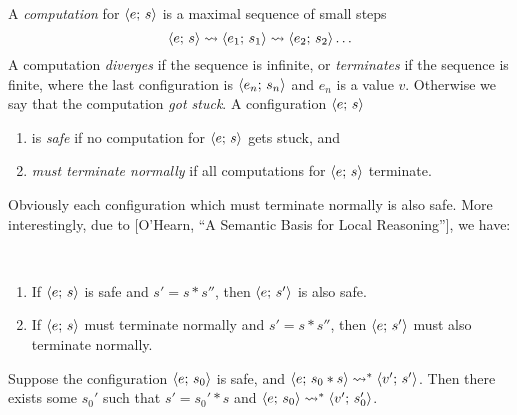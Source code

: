 \documentclass[12pt,a4paper]{article}
\begin{document}
A \emph{computation} for $\langle{e};\,{s}\rangle$ is a maximal sequence of small steps
\[\langle{e};\,{s}\rangle \rightsquigarrow \langle{e_1};\,{s_1}\rangle \rightsquigarrow \langle{e_2};\,{s_2}\rangle \ldots\]
A computation \emph{diverges} if the sequence is infinite, or \emph{terminates} if the sequence is
finite, where the last configuration is $\langle{e_n};\,{s_n}\rangle$ and $e_n$ is a value $v$. Otherwise we
say that the computation \emph{got stuck}. A configuration $\langle{e};\,{s}\rangle$
\begin{enumerate}
\item is \emph{safe} if no computation for $\langle{e};\,{s}\rangle$ gets stuck, and
\item \emph{must terminate normally} if all computations for $\langle{e};\,{s}\rangle$ terminate.
\end{enumerate}
Obviously each configuration which must terminate normally is also safe. More interestingly, due to
[O'Hearn, ``A Semantic Basis for Local Reasoning''], we have:

\begin{theorem} \
  \begin{enumerate}
  \item If $\langle{e};\,{s}\rangle$ is safe and $s' = s * s''$, then $\langle{e};\,{s'}\rangle$ is also safe.
  \item If $\langle{e};\,{s}\rangle$ must terminate normally and $s' = s * s''$, then $\langle{e};\,{s'}\rangle$ must also
    terminate normally.
  \end{enumerate}
\end{theorem}

\begin{theorem}
  Suppose the configuration $\langle{e};\,{s_0}\rangle$ is safe, and $\langle{e};\,{s_0 * s}\rangle \rightsquigarrow^* \langle{v'};\,{s'}\rangle$. Then
  there exists some $s_0'$ such that $s' = s_0' * s$ and $\langle{e};\,{s_0}\rangle \rightsquigarrow^* \langle{v'};\,{s_0'}\rangle$.
\end{theorem}


\end{document}
